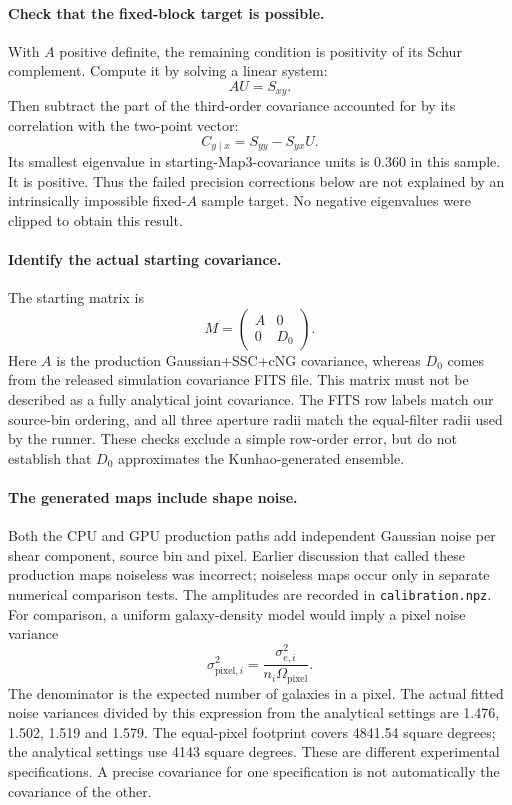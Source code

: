 \documentclass[11pt]{article}
\begin{document}
\paragraph{Check that the fixed-block target is possible.}
With $A$ positive definite, the remaining condition is positivity of
its Schur complement. Compute it by solving a linear system:
\begin{equation}
 AU=S_{xy}.
\end{equation}
Then subtract the part of the third-order covariance accounted for by
its correlation with the two-point vector:
\begin{equation}
 C_{y\mid x}=S_{yy}-S_{yx}U.
\end{equation}
Its smallest eigenvalue in starting-Map3-covariance units is 0.360 in
this sample. It is positive. Thus the failed precision corrections below
are not explained by an intrinsically impossible fixed-$A$ sample target.
No negative eigenvalues were clipped to obtain this result.

\paragraph{Identify the actual starting covariance.}
The starting matrix is
\begin{equation}
 M=\begin{pmatrix}A&0\\0&D_0\end{pmatrix}.
\end{equation}
Here $A$ is the production Gaussian+SSC+cNG covariance, whereas $D_0$
comes from the released simulation covariance FITS file. This matrix
must not be described as a fully analytical joint covariance. The FITS
row labels match our source-bin ordering, and all three aperture radii
match the equal-filter radii used by the runner. These checks exclude a
simple row-order error, but do not establish that $D_0$ approximates the
Kunhao-generated ensemble.

\paragraph{The generated maps include shape noise.}
Both the CPU and GPU production paths add independent Gaussian noise
per shear component, source bin and pixel. Earlier discussion that called
these production maps noiseless was incorrect; noiseless maps occur only
in separate numerical comparison tests. The amplitudes are recorded in
\texttt{calibration.npz}. For comparison, a uniform galaxy-density model
would imply a pixel noise variance
\begin{equation}
 \sigma_{\mathrm{pixel},i}^{2}
 =\frac{\sigma_{e,i}^{2}}{n_i\Omega_{\mathrm{pixel}}}.
\end{equation}
The denominator is the expected number of galaxies in a pixel. The actual
fitted noise variances divided by this expression from the analytical
settings are 1.476, 1.502, 1.519 and 1.579. The equal-pixel footprint covers
4841.54 square degrees; the analytical settings use 4143 square degrees.
These are different experimental specifications. A precise covariance
for one specification is not automatically the covariance of the other.
\end{document}
